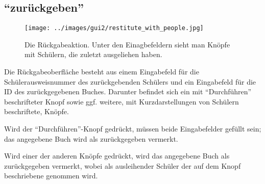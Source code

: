 \subsection{``zurückgeben''}
\label{subsec:detail:restitute}
\begin{figure}\texttt{[image: ../images/gui2/restitute\_with\_people.jpg]}\caption{Die Rückgabeaktion. Unter den Einagbefeldern sieht man Knöpfe mit Schülern, die zuletzt ausgeliehen haben.}\label{fig:restitute_with_people}\end{figure}


Die Rückgabeoberfläche besteht aus einem Eingabefeld für die Schülerausweisnummer des zurückgebenden Schülers und ein Eingabefeld für die ID des zurückgegebenen Buches. Darunter befindet sich ein mit ``Durchführen'' beschrifteter Knopf sowie ggf. weitere, mit Kurzdarstellungen von Schülern beschriftete, Knöpfe.

Wird der ``Durchführen''-Knopf gedrückt, müssen beide Eingabefelder gefüllt sein; das angegebene Buch wird als zurückgegeben vermerkt.

Wird einer der anderen Knöpfe gedrückt, wird das angegebene Buch als zurückgegeben vermerkt, wobei als ausleihender Schüler der auf dem Knopf beschriebene genommen wird.



